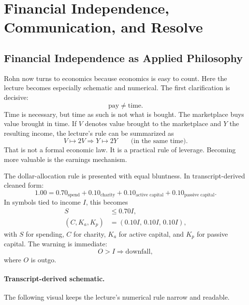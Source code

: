 \section{Financial Independence, Communication, and Resolve}

\subsection{Financial Independence as Applied Philosophy}

Rohn now turns to economics because economics is easy to count. Here the lecture becomes especially schematic and numerical. The first clarification is decisive:
\begin{equation}
\text{pay} \neq \text{time}.
\end{equation}
Time is necessary, but time as such is not what is bought. The marketplace buys value brought in time. If \(V\) denotes value brought to the marketplace and \(Y\) the resulting income, the lecture's rule can be summarized as
\begin{equation}
V \mapsto 2V \Rightarrow Y \mapsto 2Y
\qquad \text{(in the same time)}.
\end{equation}
That is not a formal economic law. It is a practical rule of leverage. Becoming more valuable is the earnings mechanism.

The dollar-allocation rule is presented with equal bluntness. In transcript-derived cleaned form:
\begin{equation}
1.00=0.70_{\text{spend}}+0.10_{\text{charity}}+0.10_{\text{active capital}}+0.10_{\text{passive capital}}.
\end{equation}
In symbols tied to income \(I\), this becomes
\begin{align}
S &\le 0.70I,\\
(C,K_a,K_p) &= (0.10I,\,0.10I,\,0.10I),
\end{align}
with \(S\) for spending, \(C\) for charity, \(K_a\) for active capital, and \(K_p\) for passive capital. The warning is immediate:
\begin{equation}
O>I \Rightarrow \mathrm{downfall},
\end{equation}
where \(O\) is outgo.

\paragraph{Transcript-derived schematic.} The following visual keeps the lecture's numerical rule narrow and readable.

